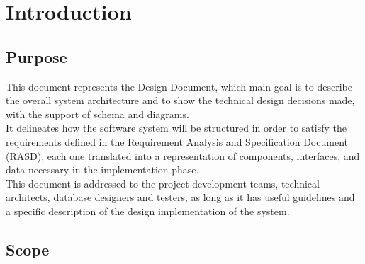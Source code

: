 \documentclass[18pt,oneside,a4paper, titlepage]{article}
\begin{document}
\newpage
\section{Introduction}		
	\subsection{Purpose}
		This document represents the Design Document, which main goal is to describe the overall system architecture and to show the technical design decisions made, with the support of schema and diagrams.\\ It delineates how the software system will be structured in order to satisfy the requirements defined in the Requirement Analysis and Specification Document (RASD), each one translated into a representation of components, interfaces, and data necessary in the implementation phase.
		\\This document is addressed to the project development teams, technical architects, database designers and testers, as long as it has useful guidelines and a specific description of the design implementation of the system.
		
	\subsection{Scope}
		
\end{document}
